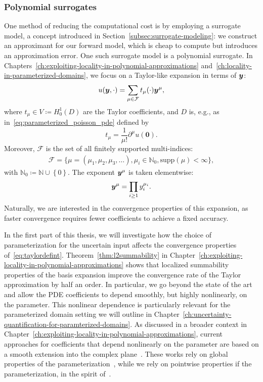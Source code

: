 \subsubsection{Polynomial surrogates}
One method of reducing the computational cost is by employing a surrogate model, a concept introduced in Section~\ref{subsec:surrogate-modeling}: we construct an approximant for our forward model, which is cheap to compute but introduces an approximation error.
One such surrogate model is a polynomial surrogate.
In Chapters~\ref{ch:exploiting-locality-in-polynomial-approximations} and~\ref{ch:locality-in-parameterized-domains}, we focus on a Taylor-like expansion in terms of ${\bm{y}}$:
\begin{equation}
{u}({\bm{y}},\cdot) = \sum_{\mu\in\mathcal{F}} t_\mu(\cdot) {\bm{y}}^\mu,\label{eq:taylordefint}
\end{equation}
where $t_\mu \in V\coloneqq H_0^1(D)$ are the Taylor coefficients, and $D$ is, e.g., as in~\eqref{eq:parameterized_poisson_pde} defined by
\begin{equation*}
    t_\mu = \frac{1}{\mu!}\partial^\mu {u}(\bm{0}).
\end{equation*}
Moreover, $\mathcal{F}$ is the set of all finitely supported multi-indices:
\begin{align*}
    \mathcal{F}=\{\mu=(\mu_1,\mu_2,\mu_3,\ldots), \mu_i \in \mathbb{N}_0, \text{supp}(\mu) < \infty \},
\end{align*}
with $\mathbb{N}_0\coloneqq\mathbb{N}\cup \left\{0\right\}$.
The exponent ${\bm{y}}^\mu$ is taken elementwise:
\begin{equation*}
    {\bm{y}}^{\mu} = \prod_{i\geq 1} y_i^{\mu_i}.
\end{equation*}
Naturally, we are interested in the convergence properties of this expansion, as faster convergence requires fewer coefficients to achieve a fixed accuracy.

In the first part of this thesis, we will investigate how the choice of parameterization for the uncertain input affects the convergence properties of~\eqref{eq:taylordefint}.
Theorem~\ref{thm:l2summability} in Chapter~\ref{ch:exploiting-locality-in-polynomial-approximations} shows that localized summability properties of the basis expansion improve the convergence rate of the Taylor approximation by half an order.
In particular, we go beyond the state of the art~\cite{bachmayr2017a,bachmayr2017b} and allow the PDE coefficients to depend smoothly, but highly nonlinearly, on the parameter.
This nonlinear dependence is particularly relevant for the parameterized domain setting we will outline in Chapter~\ref{ch:uncertainty-quantification-for-paramterized-domains}.
As discussed in a broader context in Chapter~\ref{ch:exploiting-locality-in-polynomial-approximations}, current approaches for coefficients that depend nonlinearly on the parameter are based on a smooth extension into the complex plane~\cite{chkifa2015,hiptmair2018}.
These works rely on global properties of the parameterization~\cite{babuska2014,chkifa2015}, while we rely on pointwise properties if the parameterization, in the spirit of~\cite{bachmayr2017a,bachmayr2017b,dung2022,zech2018}.

